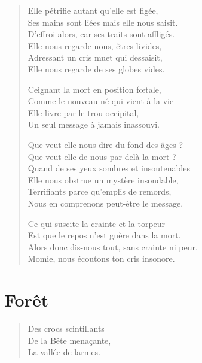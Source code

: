 \begin{verse}\sizain\quatrain%
  Elle pétrifie autant qu’elle est figée,\\  %
  Ses mains sont liées mais elle nous saisit.\\   %
  D’effroi alors, car ses traits sont affligés.\\   %
  Elle nous regarde nous, êtres livides,\\   %
  Adressant un cris muet qui dessaisit,\\   %
  Elle nous regarde de ses globes vides. 

  Ceignant la mort en position fœtale,\\   %
  Comme le nouveau-né qui vient à la vie\\   %
  Elle livre par le trou occipital,\\   %
  Un seul message à jamais inassouvi. 

  Que veut-elle nous dire du fond des âges ?\\   %
  Que veut-elle  de nous par delà la mort ?\\   %
  Quand de ses yeux sombres et insoutenables\\ 
  Elle nous obstrue un mystère insondable,\\ 
  Terrifiants parce qu’emplis de remords,\\ 
  Nous en comprenons peut-être le message. 

  Ce qui suscite la crainte et la torpeur\\   %
  Est que le repos n’est guère dans la mort.\\   %
  Alors donc dis-nous tout, sans crainte ni peur.\\   %
  Momie, nous écoutons ton cris insonore. 
\end{verse}

\section*{Forêt}
\begin{verse}\haiku
Des crocs scintillants\\  %
De la Bête menaçante,\\  %
La vallée de larmes.
\end{verse}

